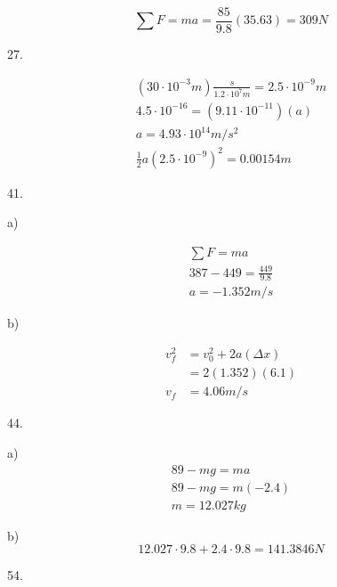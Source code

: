 \documentclass{scrreprt} %
\begin{document}
$$
\sum F = ma = \frac{85}{9.8}(35.63) = \boxed{309N}
$$

27.

\begin{align*}
	(30\cdot 10^{-3} m)\frac{s}{1.2\cdot 10^7 m} = 2.5 \cdot 10^{-9} m \\
	4.5\cdot 10^{-16} = (9.11\cdot 10^{-11})(a) \\
	a = 4.93\cdot 10^{14} m/s^2 \\
	\frac{1}{2} a (2.5\cdot 10^{-9})^2 = \boxed{0.00154 m}
\end{align*}

41.

a)

\begin{align*}
	\sum F = ma \\
	387 - 449 = \frac{449}{9.8} \\
	\boxed{a = -1.352 m/s}
\end{align*}

b)

\begin{align*}
	v_f^2 &= v_0^2 + 2a(\Delta x) \\
		  &= 2(1.352)(6.1) \\
	  v_f &= \boxed{4.06 m/s}
\end{align*}

44.

a) \begin{align*}
	89 - mg = ma \\ 
	89 - mg = m(-2.4) \\
	\boxed{m = 12.027 kg}
\end{align*}

b) $$12.027\cdot 9.8 + 2.4\cdot 9.8 = 141.3846 N$$

54.
\end{document}
